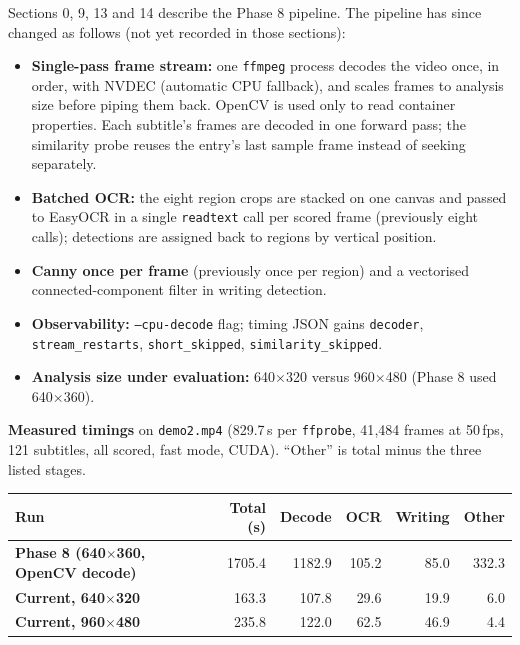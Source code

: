 \documentclass[11pt]{article}
\begin{document}
Sections 0, 9, 13 and 14 describe the Phase 8 pipeline. The pipeline has since changed as follows (not yet recorded in those sections):
\begin{itemize}[leftmargin=1.2em]
    \item \textbf{Single-pass frame stream:} one \texttt{ffmpeg} process decodes the video once, in order, with NVDEC (automatic CPU fallback), and scales frames to analysis size before piping them back. OpenCV is used only to read container properties. Each subtitle's frames are decoded in one forward pass; the similarity probe reuses the entry's last sample frame instead of seeking separately.
    \item \textbf{Batched OCR:} the eight region crops are stacked on one canvas and passed to EasyOCR in a single \texttt{readtext} call per scored frame (previously eight calls); detections are assigned back to regions by vertical position.
    \item \textbf{Canny once per frame} (previously once per region) and a vectorised connected-component filter in writing detection.
    \item \textbf{Observability:} \texttt{--cpu-decode} flag; timing JSON gains \texttt{decoder}, \texttt{stream\_restarts}, \texttt{short\_skipped}, \texttt{similarity\_skipped}.
    \item \textbf{Analysis size under evaluation:} 640$\times$320 versus 960$\times$480 (Phase 8 used 640$\times$360).
\end{itemize}

\textbf{Measured timings} on \texttt{demo2.mp4} (829.7\,s per \texttt{ffprobe}, 41{,}484 frames at 50\,fps, 121 subtitles, all scored, fast mode, CUDA). ``Other'' is total minus the three listed stages.

\begin{tabularx}{\textwidth}{>{\bfseries}l r r r r r}
\toprule
Run & Total (s) & Decode & OCR & Writing & Other \\
\midrule
Phase 8 (640$\times$360, OpenCV decode) & 1705.4 & 1182.9 & 105.2 & 85.0 & 332.3 \\
Current, 640$\times$320 & 163.3 & 107.8 & 29.6 & 19.9 & 6.0 \\
Current, 960$\times$480 & 235.8 & 122.0 & 62.5 & 46.9 & 4.4 \\
\bottomrule
\end{tabularx}
\end{document}
